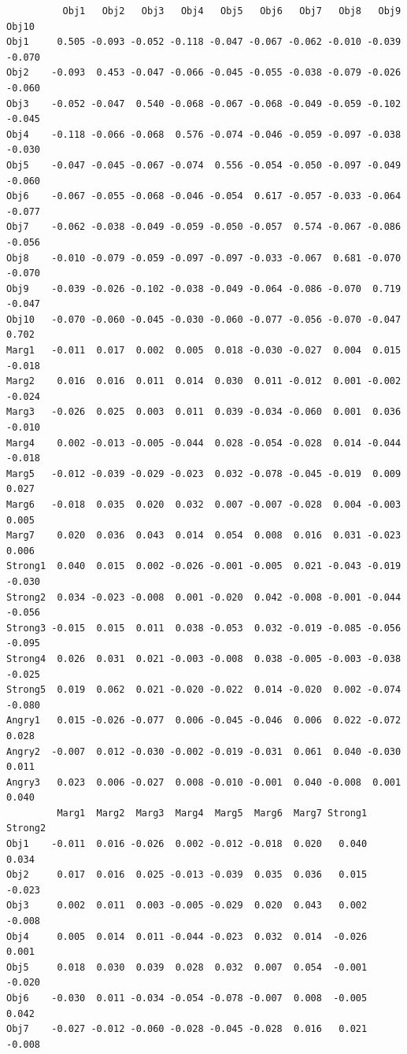 \documentclass[
  english,
]{book}
\begin{document}
\begin{verbatim}
          Obj1   Obj2   Obj3   Obj4   Obj5   Obj6   Obj7   Obj8   Obj9  Obj10
Obj1     0.505 -0.093 -0.052 -0.118 -0.047 -0.067 -0.062 -0.010 -0.039 -0.070
Obj2    -0.093  0.453 -0.047 -0.066 -0.045 -0.055 -0.038 -0.079 -0.026 -0.060
Obj3    -0.052 -0.047  0.540 -0.068 -0.067 -0.068 -0.049 -0.059 -0.102 -0.045
Obj4    -0.118 -0.066 -0.068  0.576 -0.074 -0.046 -0.059 -0.097 -0.038 -0.030
Obj5    -0.047 -0.045 -0.067 -0.074  0.556 -0.054 -0.050 -0.097 -0.049 -0.060
Obj6    -0.067 -0.055 -0.068 -0.046 -0.054  0.617 -0.057 -0.033 -0.064 -0.077
Obj7    -0.062 -0.038 -0.049 -0.059 -0.050 -0.057  0.574 -0.067 -0.086 -0.056
Obj8    -0.010 -0.079 -0.059 -0.097 -0.097 -0.033 -0.067  0.681 -0.070 -0.070
Obj9    -0.039 -0.026 -0.102 -0.038 -0.049 -0.064 -0.086 -0.070  0.719 -0.047
Obj10   -0.070 -0.060 -0.045 -0.030 -0.060 -0.077 -0.056 -0.070 -0.047  0.702
Marg1   -0.011  0.017  0.002  0.005  0.018 -0.030 -0.027  0.004  0.015 -0.018
Marg2    0.016  0.016  0.011  0.014  0.030  0.011 -0.012  0.001 -0.002 -0.024
Marg3   -0.026  0.025  0.003  0.011  0.039 -0.034 -0.060  0.001  0.036 -0.010
Marg4    0.002 -0.013 -0.005 -0.044  0.028 -0.054 -0.028  0.014 -0.044 -0.018
Marg5   -0.012 -0.039 -0.029 -0.023  0.032 -0.078 -0.045 -0.019  0.009  0.027
Marg6   -0.018  0.035  0.020  0.032  0.007 -0.007 -0.028  0.004 -0.003  0.005
Marg7    0.020  0.036  0.043  0.014  0.054  0.008  0.016  0.031 -0.023  0.006
Strong1  0.040  0.015  0.002 -0.026 -0.001 -0.005  0.021 -0.043 -0.019 -0.030
Strong2  0.034 -0.023 -0.008  0.001 -0.020  0.042 -0.008 -0.001 -0.044 -0.056
Strong3 -0.015  0.015  0.011  0.038 -0.053  0.032 -0.019 -0.085 -0.056 -0.095
Strong4  0.026  0.031  0.021 -0.003 -0.008  0.038 -0.005 -0.003 -0.038 -0.025
Strong5  0.019  0.062  0.021 -0.020 -0.022  0.014 -0.020  0.002 -0.074 -0.080
Angry1   0.015 -0.026 -0.077  0.006 -0.045 -0.046  0.006  0.022 -0.072  0.028
Angry2  -0.007  0.012 -0.030 -0.002 -0.019 -0.031  0.061  0.040 -0.030  0.011
Angry3   0.023  0.006 -0.027  0.008 -0.010 -0.001  0.040 -0.008  0.001  0.040
         Marg1  Marg2  Marg3  Marg4  Marg5  Marg6  Marg7 Strong1 Strong2
Obj1    -0.011  0.016 -0.026  0.002 -0.012 -0.018  0.020   0.040   0.034
Obj2     0.017  0.016  0.025 -0.013 -0.039  0.035  0.036   0.015  -0.023
Obj3     0.002  0.011  0.003 -0.005 -0.029  0.020  0.043   0.002  -0.008
Obj4     0.005  0.014  0.011 -0.044 -0.023  0.032  0.014  -0.026   0.001
Obj5     0.018  0.030  0.039  0.028  0.032  0.007  0.054  -0.001  -0.020
Obj6    -0.030  0.011 -0.034 -0.054 -0.078 -0.007  0.008  -0.005   0.042
Obj7    -0.027 -0.012 -0.060 -0.028 -0.045 -0.028  0.016   0.021  -0.008

\end{verbatim}
\end{document}
